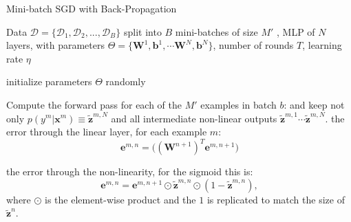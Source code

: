 \begin{algorithm}[th!]

   \caption{Mini-batch SGD with Back-Propagation}

\begin{algorithmic}[1]
\label{algo:backprop}

Data $\mathcal{D}=\{\mathcal{D}_1,\mathcal{D}_2,...,\mathcal{D}_B\}$ split into $B$ mini-batches of size $M'$%
, MLP of $N$ layers, with parameters $\Theta=\{\mathbf{W}^1, \mathbf{b}^1, \cdots \mathbf{W}^N, \mathbf{b}^N\}$, number of rounds $T$, learning rate $\eta$

   \STATE initialize parameters $\Theta$ randomly 


	\vspace{0.3cm}
	\STATE Compute the {forward pass} for each of the $M'$ examples in batch $b$:
	 and keep not only $p(y^m|\mathbf{x}^m) \equiv \tilde{\mathbf{z}}^{m,N}$ and all intermediate non-linear outputs $\tilde{\mathbf{z}}^{m,1} \cdots \tilde{\mathbf{z}}^{m,N}$.
	\ENDFOR	
	\vspace{0.3cm}
		\ENDFOR	
        \ELSE
		 the error through the linear layer, for each example $m$:  
        $$\mathbf{e}^{m,n} = \Big((\mathbf{W}^{n+1})^T \mathbf{e}^{m,n+1}\Big)$$ 
        
		 the error through the non-linearity, for the sigmoid this is:  
        $$\mathbf{e}^{m,n} = \mathbf{e}^{m,n+1} \odot \tilde{\mathbf{z}}^{m,n} \odot (\mathbf{\mathrm{1}}-\tilde{\mathbf{z}}^{m,n}),$$
        where $\odot$ is the element-wise product and the $\mathbf{\mathrm{1}}$ is replicated to match the size of $\tilde{\mathbf{z}}^n$.



\end{algorithmic}
\end{algorithm}
